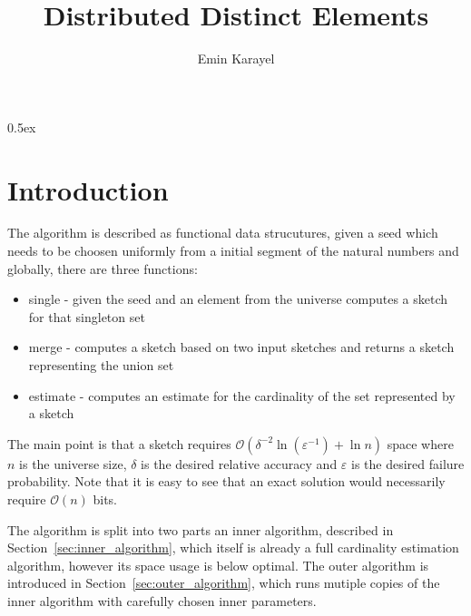 \documentclass[11pt,a4paper]{article}
\begin{document}
\title{Distributed Distinct Elements}
\author{Emin Karayel}
\maketitle


\tableofcontents

\parindent 0pt\parskip 0.5ex
\pagebreak

\section{Introduction\label{sec:intro}}
The algorithm is described as functional data strucutures, given a seed which needs to be 
choosen uniformly from a initial segment of the natural numbers and globally, there are three 
functions:
\begin{itemize}
\item \textrm{single} - given the seed and an element from the universe computes a sketch for 
that singleton set
\item \textrm{merge} - computes a sketch based on two input sketches and returns a sketch
representing the union set
\item \textrm{estimate} - computes an estimate for the cardinality of the set represented by a
sketch
\end{itemize}

The main point is that a sketch requires $\mathcal O( \delta^{-2} \ln (\varepsilon^{-1}) + \ln n)$
space where $n$ is the universe size, $\delta$ is the desired relative accuracy and $\varepsilon$ is
the desired failure probability. Note that it is easy to see that an exact solution would
necessarily require $\mathcal O(n)$ bits.

The algorithm is split into two parts an inner algorithm, described in 
Section~\ref{sec:inner_algorithm}, which itself is already a full cardinality estimation algorithm,
however its space usage is below optimal. The outer algorithm is introduced in 
Section~\ref{sec:outer_algorithm}, which runs mutiple copies of the inner algorithm with carefully
chosen inner parameters. 
\end{document}

